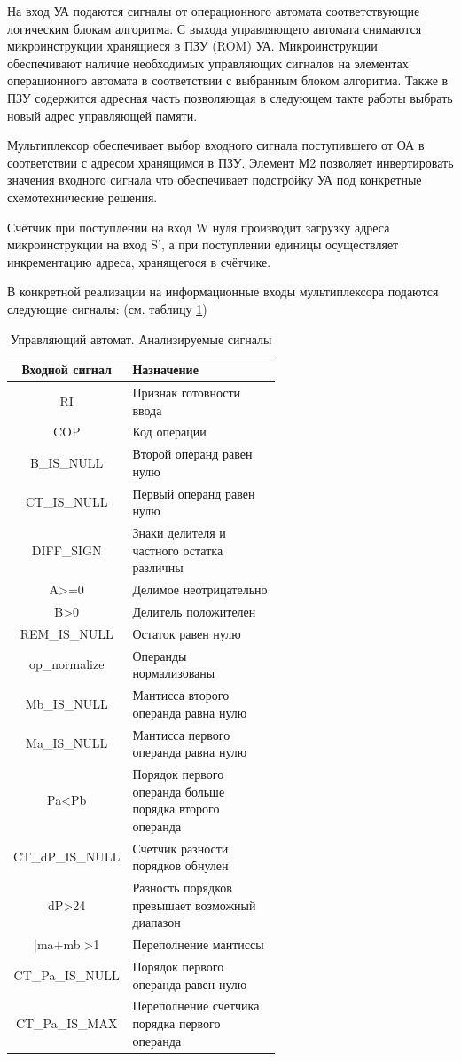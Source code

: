 \documentclass[a4paper,14pt]{extarticle}
\begin{document}
На вход УА подаются сигналы от операционного автомата соответствующие логическим блокам алгоритма. С выхода управляющего автомата снимаются микроинструкции хранящиеся в ПЗУ (ROM) УА. Микроинструкции обеспечивают наличие необходимых управляющих сигналов на элементах операционного автомата в соответствии с выбранным блоком алгоритма. Также в ПЗУ содержится адресная часть позволяющая в следующем такте работы выбрать новый адрес управляющей памяти.

Мультиплексор обеспечивает выбор входного сигнала поступившего от ОА в соответствии с адресом хранящимся в ПЗУ.
Элемент М2 позволяет инвертировать значения входного сигнала что обеспечивает подстройку УА под конкретные схемотехнические решения.

Счётчик при поступлении на вход W нуля производит загрузку адреса микроинструкции на вход S', а при поступлении единицы осуществляет инкрементацию адреса, хранящегося в счётчике.




В конкретной реализации на информационные входы мультиплексора подаются следующие сигналы: (см. таблицу \ref{tab:signalsma})
\hypertarget{name}{}
\begin{table}[h!]
	\centering
	\small
	\begin{tabular}{|c|m{0.6\linewidth}|}
		\hline
		\textbf{Входной сигнал} & \textbf{Назначение} \\ \hline
		RI & Признак готовности ввода \\ \hline
		COP & Код операции  \\ \hline
		B\_IS\_NULL & Второй операнд равен нулю \\ \hline
		CT\_IS\_NULL & Первый операнд равен нулю \\ \hline
		DIFF\_SIGN & Знаки делителя и частного остатка различны \\ \hline
		A>=0 & Делимое неотрицательно \\ \hline
		B>0 & Делитель положителен \\ \hline
		REM\_IS\_NULL & Остаток равен нулю \\ \hline
		op\_normalize & Операнды нормализованы \\ \hline
		Mb\_IS\_NULL & Мантисса второго операнда равна нулю \\ \hline
		Ma\_IS\_NULL & Мантисса первого операнда равна нулю \\ \hline
		Pa<Pb & Порядок первого операнда больше порядка второго операнда \\ \hline
		CT\_dP\_IS\_NULL & Счетчик разности порядков обнулен \\ \hline
		dP>24 & Разность порядков превышает возможный диапазон \\ \hline
		|ma+mb|>1 & Переполнение мантиссы \\ \hline
		CT\_Pa\_IS\_NULL & Порядок первого операнда равен нулю \\ \hline
		CT\_Pa\_IS\_MAX & Переполнение счетчика порядка первого операнда \\ \hline
	\end{tabular}
	\caption{Управляющий автомат. Анализируемые сигналы}
	\label{tab:signalsma}
\end{table}
\end{document}
